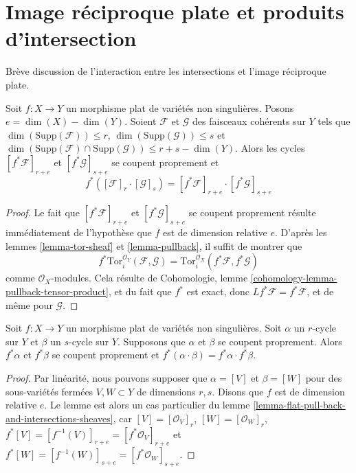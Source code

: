 \section{Image réciproque plate et produits d'intersection}
\label{section-flat-pullback-and-intersection-products}

\noindent
Brève discussion de l'interaction entre les intersections et
l'image réciproque plate.

\begin{lemma}
\label{lemma-flat-pull-back-and-intersections-sheaves}
Soit $f : X \to Y$ un morphisme plat de variétés non singulières. Posons
$e = \dim(X) - \dim(Y)$. Soient $\mathcal{F}$ et $\mathcal{G}$ des faisceaux
cohérents sur $Y$ tels que $\dim(\text{Supp}(\mathcal{F})) \leq r$,
$\dim(\text{Supp}(\mathcal{G})) \leq s$ et
$\dim(\text{Supp}(\mathcal{F}) \cap \text{Supp}(\mathcal{G}) )
\leq r + s - \dim(Y)$. Alors les cycles
$[f^*\mathcal{F}]_{r + e}$ et $[f^*\mathcal{G}]_{s + e}$
se coupent proprement et
$$
f^*([\mathcal{F}]_r \cdot [\mathcal{G}]_s) =
[f^*\mathcal{F}]_{r + e} \cdot [f^*\mathcal{G}]_{s + e}
$$
\end{lemma}

\begin{proof}
Le fait que $[f^*\mathcal{F}]_{r + e}$ et $[f^*\mathcal{G}]_{s + e}$
se coupent proprement résulte immédiatement de l'hypothèse que $f$ est de
dimension relative $e$. D'après les
lemmes \ref{lemma-tor-sheaf} et \ref{lemma-pullback},
il suffit de montrer que
$$
f^*\text{Tor}_i^{\mathcal{O}_Y}(\mathcal{F}, \mathcal{G}) =
\text{Tor}_i^{\mathcal{O}_X}(f^*\mathcal{F}, f^*\mathcal{G})
$$
comme $\mathcal{O}_X$-modules. Cela résulte de
Cohomologie, lemme \ref{cohomology-lemma-pullback-tensor-product},
et du fait que $f^*$ est exact, donc $Lf^*\mathcal{F} = f^*\mathcal{F}$,
et de même pour $\mathcal{G}$.
\end{proof}

\begin{lemma}
\label{lemma-flat-pullback-and-intersections}
Soit $f : X \to Y$ un morphisme plat de variétés non singulières.
Soit $\alpha$ un $r$-cycle sur $Y$ et $\beta$ un $s$-cycle sur $Y$.
Supposons que $\alpha$ et $\beta$ se coupent proprement. Alors $f^*\alpha$
et $f^*\beta$ se coupent proprement et
$f^*( \alpha \cdot \beta ) = f^*\alpha \cdot f^*\beta$.
\end{lemma}

\begin{proof}
Par linéarité, nous pouvons supposer que $\alpha = [V]$ et $\beta = [W]$
pour des sous-variétés fermées $V, W \subset Y$ de dimensions $r, s$.
Disons que $f$ est de dimension relative $e$. Le lemme est alors un cas particulier du
lemme \ref{lemma-flat-pull-back-and-intersections-sheaves},
car $[V] = [\mathcal{O}_V]_r$, $[W] = [\mathcal{O}_W]_r$,
$f^*[V] = [f^{-1}(V)]_{r + e} = [f^*\mathcal{O}_V]_{r + e}$ et
$f^*[W] = [f^{-1}(W)]_{s + e} = [f^*\mathcal{O}_W]_{s + e}$.
\end{proof}


